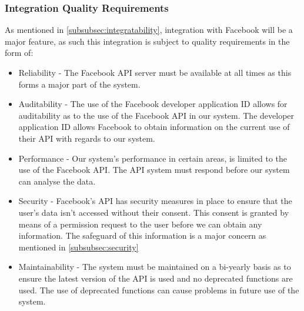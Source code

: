 \documentclass{article}
\begin{document}
		\subsubsection{Integration Quality Requirements}
		As mentioned in \ref{subsubsec:integratability}, integration with Facebook will be a major feature, as such this integration is subject to quality requirements in the form of:
		\begin{itemize}
			\item Reliability - The Facebook API server must be available at all times as this forms a major part of the system.
			\item Auditability - The use of the Facebook developer application ID allows for auditability as to the use of the Facebook API in our system. The developer application ID allows Facebook to obtain information on the current use of their API with regards to our system.
			\item Performance - Our system's performance in certain areas, is limited to the use of the Facebook API. The API system must respond before our system can analyse the data.
			\item Security - Facebook's API has security measures in place to ensure that the user's data isn't accessed without their consent. This consent is granted by means of a permission request to the user before we can obtain any information. The safeguard of this information is a major concern as mentioned in \ref{subsubsec:security}
			\item Maintainability - The system must be maintained on a bi-yearly basis as to ensure the latest version of the API is used and no deprecated functions are used. The use of deprecated functions can cause problems in future use of the system.
		\end{itemize}

	
\end{document}

